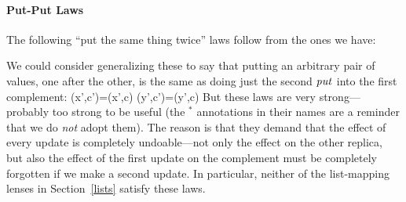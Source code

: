 \iffull
\paragraph*{Put-Put Laws}

\begin{lemma} The following ``put the same thing twice'' laws follow from
the ones we have:
\end{lemma}

We could consider generalizing these to say that putting an arbitrary pair
of values, one after the other, is the same as doing just the second $\mathit{put}$
into the first complement:
{
 {\putr(x',c')=\putr(x',c)}
 {\putl(y',c')=\putl(y',c)}
}
%
But these laws are very strong---probably too strong to be useful (the
$^\ast$ annotations in their names are a reminder that we do {\em not} adopt
them).  The reason is that they demand that the effect of every update is
completely undoable---not only the effect on the other replica, but also the
effect of the first update on the complement must be completely forgotten if
we make a second update.  In particular, neither of the list-mapping lenses
in Section~\ref{lists} satisfy these laws.
\fi


